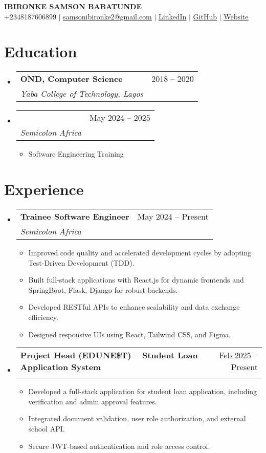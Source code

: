 \documentclass[letterpaper,11pt]{article}
\makeatletter
\newcommand{\resumeItem}[1]{
  \item\small{
    {#1 \vspace{-2pt}}
  }
}
\newcommand{\resumeSubheading}[4]{
  \vspace{-2pt}\item
    \begin{tabular*}{0.97\textwidth}[t]{l@{\extracolsep{\fill}}r}
      \textbf{#1} & #2 \\
      \textit{\small#3} & \textit{\small #4} \\
    \end{tabular*}\vspace{-7pt}
}
\newcommand{\resumeSubHeadingListStart}{\begin{itemize}[leftmargin=0.15in, label={}]}
\newcommand{\resumeSubHeadingListEnd}{\end{itemize}}
\newcommand{\resumeItemListStart}{\begin{itemize}}
\newcommand{\resumeItemListEnd}{\end{itemize}\vspace{-5pt}}
\makeatother
\begin{document}
\begin{center}
    \textbf{\Huge \scshape IBIRONKE SAMSON BABATUNDE} \\ \vspace{1pt}
    \small +2348187606899 $|$ \href{mailto:samsonibironke2@gmail.com}{\underline{samsonibironke2@gmail.com}} $|$ \href{https://linkedin.com/Samson-ibironke}{\underline{LinkedIn}} $|$ \href{https://github.com/samibyrone}{\underline{GitHub}} $|$ \href{https://ibironkesamson.netlify.app}{\underline{Website}}
\end{center}

\section{Education}
  \resumeSubHeadingListStart
    \resumeSubheading
      {OND, Computer Science}{2018 -- 2020}
      {Yaba College of Technology, Lagos}{}
    \resumeSubheading
      {}{May 2024 -- 2025}
      {Semicolon Africa}{}
      \resumeItemListStart
        \resumeItem{Software Engineering Training}
      \resumeItemListEnd
  \resumeSubHeadingListEnd

\section{Experience}
  \resumeSubHeadingListStart
    \resumeSubheading
      {Trainee Software Engineer}{May 2024 -- Present}
      {Semicolon Africa}{}
      \resumeItemListStart
        \resumeItem{Improved code quality and accelerated development cycles by adopting Test-Driven Development (TDD).}
        \resumeItem{                                    Built full-stack applications with React.js for dynamic frontends and SpringBoot, Flask, Django for robust backends.}
        \resumeItem{                                    Developed RESTful APIs to enhance scalability and data exchange efficiency.}
        \resumeItem{                                    Designed responsive UIs using React, Tailwind CSS, and Figma.}
      \resumeItemListEnd
    \resumeSubheading
      {Project Head (EDUNE\$T) -- Student Loan Application System}{Feb 2025 -- Present}
      {}{}
      \resumeItemListStart
        \resumeItem{Developed a full-stack application for student loan application, including verification and admin approval features.}
        \resumeItem{                                    Integrated document validation, user role authorization, and external school API.}
        \resumeItem{                                    Secure JWT-based authentication and role access control.}
      \resumeItemListEnd
  \resumeSubHeadingListEnd
\end{document}
